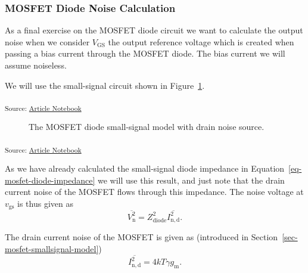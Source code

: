 \documentclass[
  a4paper,
  DIV=11,
  numbers=noendperiod]{scrartcl}
\begin{document}
\subsubsection{MOSFET Diode Noise
Calculation}\label{mosfet-diode-noise-calculation}

As a final exercise on the MOSFET diode circuit we want to calculate the
output noise when we consider \(V_\mathrm{GS}\) the output reference
voltage which is created when passing a bias current through the MOSFET
diode. The bias current we will assume noiseless.

We will use the small-signal circuit shown in
Figure~\ref{fig-mosfet-diode-small-signal-w-noise}.

\textsubscript{Source:
\href{https://iic-jku.github.io/analog-circuit-design/index.qmd.html}{Article
Notebook}}

\begin{figure}[H]


\caption{\label{fig-mosfet-diode-small-signal-w-noise}The MOSFET diode
small-signal model with drain noise source.}

\end{figure}%

\textsubscript{Source:
\href{https://iic-jku.github.io/analog-circuit-design/index.qmd.html}{Article
Notebook}}

As we have already calculated the small-signal diode impedance in
Equation~\ref{eq-mosfet-diode-impedance} we will use this result, and
just note that the drain current noise of the MOSFET flows through this
impedance. The noise voltage at \(v_\mathrm{gs}\) is thus given as \[
\overline{V_\mathrm{n}^2} = Z_\mathrm{diode}^2 \overline{I_\mathrm{n,d}^2}.
\]

The drain current noise of the MOSFET is given as (introduced in
Section~\ref{sec-mosfet-smallsignal-model}) \[
\overline{I_\mathrm{n,d}^2} = 4 k T \gamma g_\mathrm{m}.
\]
\end{document}
